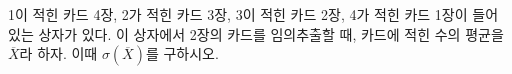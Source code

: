 1이 적힌 카드 4장, 2가 적힌 카드 3장, 3이 적힌 카드 2장, 4가 적힌 카드 1장이 들어 있는 상자가 있다. 이 상자에서 2장의 카드를 임의추출할 때, 카드에 적힌 수의 평균을 $\overline{X}$라 하자. 이때 $\sigma(\overline{X})$를 구하시오.
